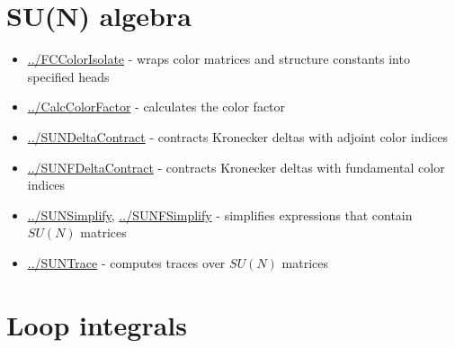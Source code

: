 \documentclass[../FeynCalcManual.tex]{subfiles}
\begin{document}
\hypertarget{su(n) algebra}{
\section{SU(N) algebra}\label{su(n) algebra}}

\begin{itemize}
\tightlist
\item
  \hyperlink{../fccolorisolate}{../FCColorIsolate} - wraps color
  matrices and structure constants into specified heads
\item
  \hyperlink{../calccolorfactor}{../CalcColorFactor} - calculates the
  color factor
\item
  \hyperlink{../sundeltacontract}{../SUNDeltaContract} - contracts
  Kronecker deltas with adjoint color indices
\item
  \hyperlink{../sunfdeltacontract}{../SUNFDeltaContract} - contracts
  Kronecker deltas with fundamental color indices
\item
  \hyperlink{../sunsimplify}{../SUNSimplify},
  \hyperlink{../sunfsimplify}{../SUNFSimplify} - simplifies expressions
  that contain \(SU(N)\) matrices
\item
  \hyperlink{../suntrace}{../SUNTrace} - computes traces over \(SU(N)\)
  matrices
\end{itemize}

\hypertarget{loop integrals}{
\section{Loop integrals}\label{loop integrals}}
\end{document}
